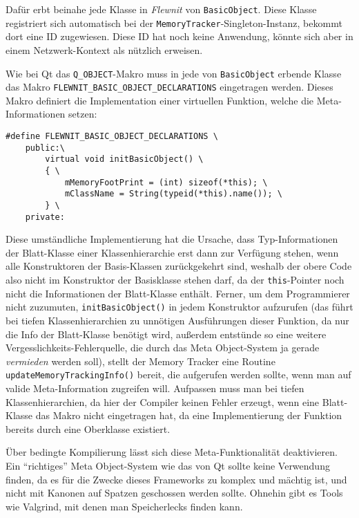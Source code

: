 	Dafür erbt beinahe jede Klasse in \emph{Flewnit} von \lstinline|BasicObject|.
	Diese Klasse registriert sich automatisch bei der \lstinline|MemoryTracker|-Singleton-Instanz, bekommt dort eine
	ID zugewiesen. Diese ID hat noch keine Anwendung, könnte sich aber in einem Netzwerk-Kontext als nützlich erweisen.

	Wie bei Qt das \lstinline[language=C++]|Q_OBJECT|-Makro muss in jede von 
	\lstinline[language=C++]|BasicObject| erbende Klasse das Makro 
	\lstinline[language=C++]|FLEWNIT_BASIC_OBJECT_DECLARATIONS| eingetragen werden. Dieses Makro definiert die 
	Implementation einer virtuellen Funktion, welche die Meta-Informationen setzen:
    \begin{lstlisting}
#define FLEWNIT_BASIC_OBJECT_DECLARATIONS \
	public:\
		virtual void initBasicObject() \
		{ \
			mMemoryFootPrint = (int) sizeof(*this); \
			mClassName = String(typeid(*this).name()); \
		} \
	private:	
	\end{lstlisting}
	Diese umständliche Implementierung hat die Ursache, dass Typ-Informationen der Blatt-Klasse einer
	Klassenhierarchie erst dann zur Verfügung stehen, wenn alle Konstruktoren der Basis-Klassen zurückgekehrt sind,
	weshalb der obere Code also nicht im Konstruktor der Basisklasse stehen darf, da der \lstinline|this|-Pointer
	noch nicht die Informationen der Blatt-Klasse enthält.
	Ferner, um dem Programmierer nicht zuzumuten, \lstinline|initBasicObject()| in jedem Konstruktor aufzurufen
	(das führt bei tiefen Klassenhierarchien zu unnötigen Ausführungen dieser Funktion, da nur die Info der Blatt-Klasse
	benötigt wird, außerdem entstünde so eine weitere Vergesslichkeits-Fehlerquelle, die durch das Meta Object-System ja 
	gerade \emph{vermieden} werden soll), stellt der Memory Tracker eine Routine \lstinline|updateMemoryTrackingInfo()|
	bereit, die aufgerufen werden sollte, wenn man auf valide Meta-Information zugreifen will.
	Aufpassen muss man bei tiefen Klassenhierarchien, da hier der Compiler keinen Fehler erzeugt, wenn eine Blatt-Klasse
	das Makro nicht eingetragen hat, da eine Implementierung der Funktion bereits durch eine Oberklasse existiert.
	
	Über bedingte Kompilierung lässt sich diese Meta-Funktionalität deaktivieren.
	Ein "`richtiges"' Meta Object-System wie das von Qt sollte keine Verwendung finden, 
	da es für die Zwecke dieses Frameworks zu komplex und mächtig ist, und nicht 
	mit Kanonen auf Spatzen geschossen werden sollte. Ohnehin gibt es Tools wie Valgrind, mit denen
	man Speicherlecks finden kann. 

